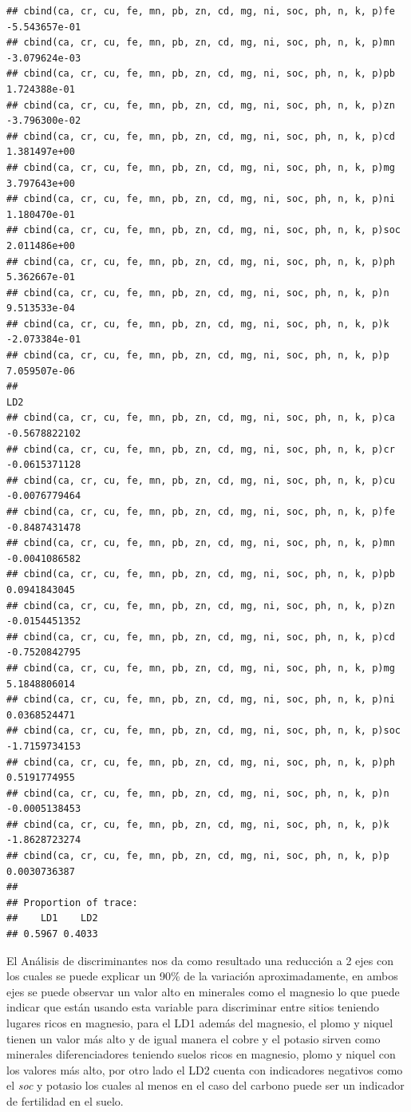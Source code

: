 \documentclass[
]{article}
\begin{document}
\begin{verbatim}
## cbind(ca, cr, cu, fe, mn, pb, zn, cd, mg, ni, soc, ph, n, k, p)fe  -5.543657e-01
## cbind(ca, cr, cu, fe, mn, pb, zn, cd, mg, ni, soc, ph, n, k, p)mn  -3.079624e-03
## cbind(ca, cr, cu, fe, mn, pb, zn, cd, mg, ni, soc, ph, n, k, p)pb   1.724388e-01
## cbind(ca, cr, cu, fe, mn, pb, zn, cd, mg, ni, soc, ph, n, k, p)zn  -3.796300e-02
## cbind(ca, cr, cu, fe, mn, pb, zn, cd, mg, ni, soc, ph, n, k, p)cd   1.381497e+00
## cbind(ca, cr, cu, fe, mn, pb, zn, cd, mg, ni, soc, ph, n, k, p)mg   3.797643e+00
## cbind(ca, cr, cu, fe, mn, pb, zn, cd, mg, ni, soc, ph, n, k, p)ni   1.180470e-01
## cbind(ca, cr, cu, fe, mn, pb, zn, cd, mg, ni, soc, ph, n, k, p)soc  2.011486e+00
## cbind(ca, cr, cu, fe, mn, pb, zn, cd, mg, ni, soc, ph, n, k, p)ph   5.362667e-01
## cbind(ca, cr, cu, fe, mn, pb, zn, cd, mg, ni, soc, ph, n, k, p)n    9.513533e-04
## cbind(ca, cr, cu, fe, mn, pb, zn, cd, mg, ni, soc, ph, n, k, p)k   -2.073384e-01
## cbind(ca, cr, cu, fe, mn, pb, zn, cd, mg, ni, soc, ph, n, k, p)p    7.059507e-06
##                                                                              LD2
## cbind(ca, cr, cu, fe, mn, pb, zn, cd, mg, ni, soc, ph, n, k, p)ca  -0.5678822102
## cbind(ca, cr, cu, fe, mn, pb, zn, cd, mg, ni, soc, ph, n, k, p)cr  -0.0615371128
## cbind(ca, cr, cu, fe, mn, pb, zn, cd, mg, ni, soc, ph, n, k, p)cu  -0.0076779464
## cbind(ca, cr, cu, fe, mn, pb, zn, cd, mg, ni, soc, ph, n, k, p)fe  -0.8487431478
## cbind(ca, cr, cu, fe, mn, pb, zn, cd, mg, ni, soc, ph, n, k, p)mn  -0.0041086582
## cbind(ca, cr, cu, fe, mn, pb, zn, cd, mg, ni, soc, ph, n, k, p)pb   0.0941843045
## cbind(ca, cr, cu, fe, mn, pb, zn, cd, mg, ni, soc, ph, n, k, p)zn  -0.0154451352
## cbind(ca, cr, cu, fe, mn, pb, zn, cd, mg, ni, soc, ph, n, k, p)cd  -0.7520842795
## cbind(ca, cr, cu, fe, mn, pb, zn, cd, mg, ni, soc, ph, n, k, p)mg   5.1848806014
## cbind(ca, cr, cu, fe, mn, pb, zn, cd, mg, ni, soc, ph, n, k, p)ni   0.0368524471
## cbind(ca, cr, cu, fe, mn, pb, zn, cd, mg, ni, soc, ph, n, k, p)soc -1.7159734153
## cbind(ca, cr, cu, fe, mn, pb, zn, cd, mg, ni, soc, ph, n, k, p)ph   0.5191774955
## cbind(ca, cr, cu, fe, mn, pb, zn, cd, mg, ni, soc, ph, n, k, p)n   -0.0005138453
## cbind(ca, cr, cu, fe, mn, pb, zn, cd, mg, ni, soc, ph, n, k, p)k   -1.8628723274
## cbind(ca, cr, cu, fe, mn, pb, zn, cd, mg, ni, soc, ph, n, k, p)p    0.0030736387
## 
## Proportion of trace:
##    LD1    LD2 
## 0.5967 0.4033
\end{verbatim}

El Análisis de discriminantes nos da como resultado una reducción a 2
ejes con los cuales se puede explicar un 90\% de la variación
aproximadamente, en ambos ejes se puede observar un valor alto en
minerales como el magnesio lo que puede indicar que están usando esta
variable para discriminar entre sitios teniendo lugares ricos en
magnesio, para el LD1 además del magnesio, el plomo y niquel tienen un
valor más alto y de igual manera el cobre y el potasio sirven como
minerales diferenciadores teniendo suelos ricos en magnesio, plomo y
niquel con los valores más alto, por otro lado el LD2 cuenta con
indicadores negativos como el \emph{soc} y potasio los cuales al menos
en el caso del carbono puede ser un indicador de fertilidad en el suelo.
\end{document}
